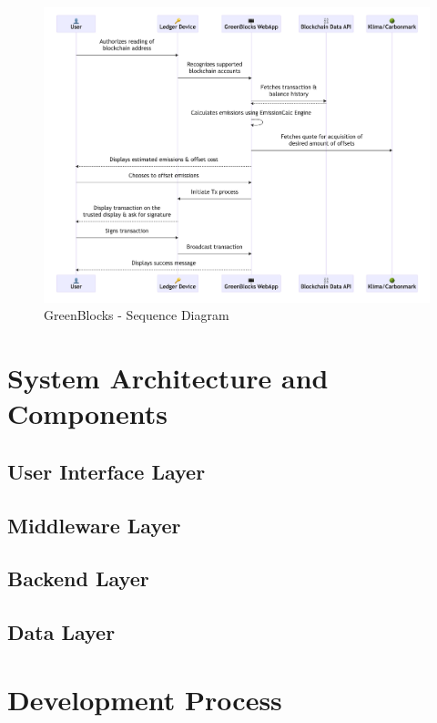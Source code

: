 \documentclass[11pt]{report}
\begin{document}
\begin{figure}[hbt!]
    \centering
    \centerline{\includegraphics[scale=.27]{figures/sequence.png}}
    \caption{GreenBlocks - Sequence Diagram}
    \label{fig:sequence}
\end{figure}



\section{System Architecture and Components}
\subsection{User Interface Layer}
\subsection{Middleware Layer}
\subsection{Backend Layer}
\subsection{Data Layer}
\section{Development Process}
\end{document}
